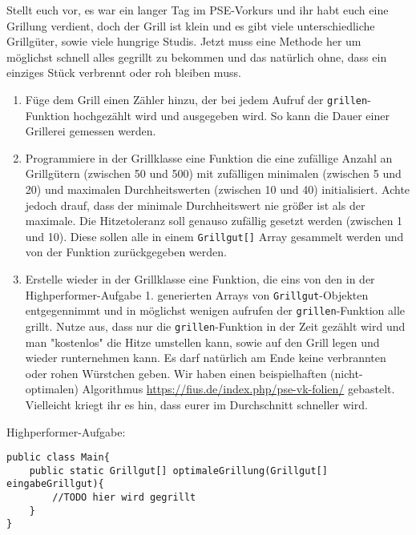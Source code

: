 \documentclass{../../sheet}
\begin{document}
\newpage
{}
Stellt euch vor, es war ein langer Tag im PSE-Vorkurs und ihr habt euch eine Grillung verdient, doch der Grill ist klein und es gibt viele unterschiedliche Grillgüter, sowie viele hungrige Studis. Jetzt muss eine Methode her um möglichst schnell alles gegrillt zu bekommen und das natürlich ohne, dass ein einziges Stück verbrennt oder roh bleiben muss.
\begin{enumerate}
    \item Füge dem Grill einen Zähler hinzu, der bei jedem Aufruf der \texttt{grillen}-Funktion hochgezählt wird und ausgegeben wird. So kann die Dauer einer Grillerei gemessen werden.
    \item Programmiere in der Grillklasse eine Funktion die eine zufällige Anzahl an Grillgütern (zwischen 50 und 500) mit zufälligen minimalen (zwischen 5 und 20) und maximalen Durchheitswerten (zwischen 10 und 40) initialisiert. Achte jedoch drauf, dass der minimale Durchheitswert nie größer ist als der maximale. Die Hitzetoleranz soll genauso zufällig gesetzt werden (zwischen 1 und 10). Diese sollen alle in einem \texttt{Grillgut[]} Array gesammelt werden und von der Funktion zurückgegeben werden. 
    \item Erstelle wieder in der Grillklasse eine Funktion, die eins von den in der Highperformer-Aufgabe 1. generierten Arrays von \texttt{Grillgut}-Objekten entgegennimmt und in möglichst wenigen aufrufen der \texttt{grillen}-Funktion alle grillt. Nutze aus, dass nur die \texttt{grillen}-Funktion in der Zeit gezählt wird und man "kostenlos"  die Hitze umstellen kann, sowie auf den Grill legen und wieder runternehmen kann. Es darf natürlich am Ende keine verbrannten oder rohen Würstchen geben. Wir haben einen beispielhaften (nicht-optimalen) Algorithmus \url{https://fius.de/index.php/pse-vk-folien/} gebastelt. Vielleicht kriegt ihr es hin, dass eurer im Durchschnitt schneller wird.
\end{enumerate}

\newpage
{}
Highperformer-Aufgabe:
\hypertarget{Highperformer}{}
\begin{verbatim}
public class Main{
    public static Grillgut[] optimaleGrillung(Grillgut[] eingabeGrillgut){
        //TODO hier wird gegrillt
    }
}
\end{verbatim}
\end{document}
